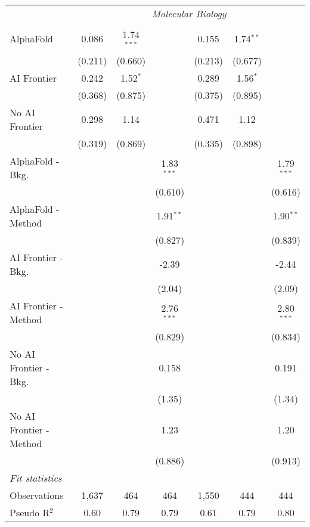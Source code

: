 \begin{tabular}{lcccccc}
 & \multicolumn{6}{c}{\textit{Molecular Biology}} \\ \\
   AlphaFold               & 0.086   & 1.74$^{***}$ &              & 0.155   & 1.74$^{**}$ &   \\   
                           & (0.211) & (0.660)      &              & (0.213) & (0.677)     &   \\   
   AI Frontier             & 0.242   & 1.52$^{*}$   &              & 0.289   & 1.56$^{*}$  &   \\   
                           & (0.368) & (0.875)      &              & (0.375) & (0.895)     &   \\   
   No AI Frontier          & 0.298   & 1.14         &              & 0.471   & 1.12        &   \\   
                           & (0.319) & (0.869)      &              & (0.335) & (0.898)     &   \\   
   AlphaFold - Bkg.        &         &              & 1.83$^{***}$ &         &             & 1.79$^{***}$\\   
                           &         &              & (0.610)      &         &             & (0.616)\\   
   AlphaFold - Method      &         &              & 1.91$^{**}$  &         &             & 1.90$^{**}$\\   
                           &         &              & (0.827)      &         &             & (0.839)\\   
   AI Frontier - Bkg.      &         &              & -2.39        &         &             & -2.44\\   
                           &         &              & (2.04)       &         &             & (2.09)\\   
   AI Frontier - Method    &         &              & 2.76$^{***}$ &         &             & 2.80$^{***}$\\   
                           &         &              & (0.829)      &         &             & (0.834)\\   
   No AI Frontier - Bkg.   &         &              & 0.158        &         &             & 0.191\\   
                           &         &              & (1.35)       &         &             & (1.34)\\   
   No AI Frontier - Method &         &              & 1.23         &         &             & 1.20\\   
                           &         &              & (0.886)      &         &             & (0.913)\\   
   \midrule
   \emph{Fit statistics}\\
   Observations            & 1,637   & 464          & 464          & 1,550   & 444         & 444\\  
   Pseudo R$^2$            & 0.60    & 0.79         & 0.79         & 0.61    & 0.79        & 0.80\\  
   

\end{tabular}
